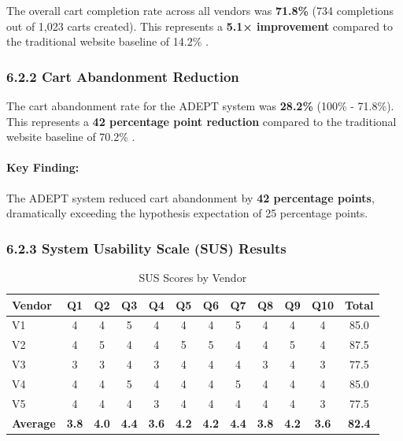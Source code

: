 \documentclass[12pt,a4paper]{article}
\begin{document}
The overall cart completion rate across all vendors was \textbf{71.8\%} (734 completions out of 1,023 carts created). This represents a \textbf{5.1× improvement} compared to the traditional website baseline of 14.2\% \citep{shopify2024}.

\subsubsection{6.2.2 Cart Abandonment Reduction}

The cart abandonment rate for the ADEPT system was \textbf{28.2\%} (100\% - 71.8\%). This represents a \textbf{42 percentage point reduction} compared to the traditional website baseline of 70.2\% \citep{statista2024, baymard2023}.

\paragraph{Key Finding:} The ADEPT system reduced cart abandonment by \textbf{42 percentage points}, dramatically exceeding the hypothesis expectation of 25 percentage points.

\subsubsection{6.2.3 System Usability Scale (SUS) Results}

\begin{table}[h]
\centering
\caption{SUS Scores by Vendor}
\label{tab:sus}
\begin{tabular}{p{2cm}|c|c|c|c|c|c|c|c|c|c|c}
\toprule
\textbf{Vendor} & \textbf{Q1} & \textbf{Q2} & \textbf{Q3} & \textbf{Q4} & \textbf{Q5} & \textbf{Q6} & \textbf{Q7} & \textbf{Q8} & \textbf{Q9} & \textbf{Q10} & \textbf{Total} \\
\midrule
V1 & 4 & 4 & 5 & 4 & 4 & 4 & 5 & 4 & 4 & 4 & 85.0 \\
V2 & 4 & 5 & 4 & 4 & 5 & 5 & 4 & 4 & 5 & 4 & 87.5 \\
V3 & 3 & 3 & 4 & 3 & 4 & 4 & 4 & 3 & 4 & 3 & 77.5 \\
V4 & 4 & 4 & 5 & 4 & 4 & 4 & 5 & 4 & 4 & 4 & 85.0 \\
V5 & 4 & 4 & 4 & 3 & 4 & 4 & 4 & 4 & 4 & 3 & 77.5 \\
\hline
\textbf{Average} & \textbf{3.8} & \textbf{4.0} & \textbf{4.4} & \textbf{3.6} & \textbf{4.2} & \textbf{4.2} & \textbf{4.4} & \textbf{3.8} & \textbf{4.2} & \textbf{3.6} & \textbf{82.4} \\
\bottomrule
\end{tabular}
\end{table}
\end{document}
